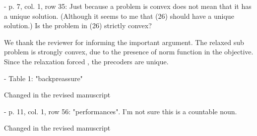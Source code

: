  - p. 7, col. 1, row 35: Just because a problem is convex does not mean that it has a unique solution. (Although it seems to me that (26) should have a unique solution.) Is the problem in (26) strictly convex?

\resp We thank the reviewer for informing the important argument. The relaxed sub problem is strongly convex, due to the presence of norm function in the objective. Since the relaxation forced , the precoders are unique.

 - Table 1: "backpreassure"

\resp Changed in the revised manuscript

 - p. 11, col. 1, row 56: "performances". I'm not sure this is a countable noun.

\resp Changed in the revised manuscript

